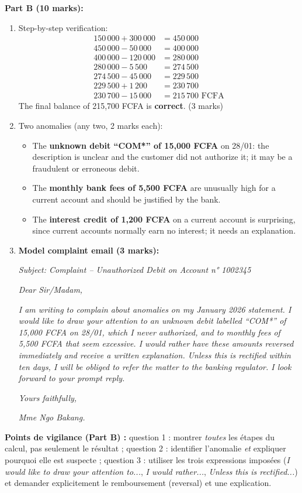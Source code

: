 \documentclass[11pt]{article}
\begin{document}
\begin{corrige}
\textbf{Part B (10 marks):}
\begin{enumerate}
    \item Step-by-step verification:
    \begin{align*}
    150\,000 + 300\,000 &= 450\,000 \\
    450\,000 - 50\,000 &= 400\,000 \\
    400\,000 - 120\,000 &= 280\,000 \\
    280\,000 - 5\,500 &= 274\,500 \\
    274\,500 - 45\,000 &= 229\,500 \\
    229\,500 + 1\,200 &= 230\,700 \\
    230\,700 - 15\,000 &= 215\,700 \text{ FCFA}
    \end{align*}
    The final balance of 215,700 FCFA is \textbf{correct}. (3 marks)
    \item Two anomalies (any two, 2 marks each):
    \begin{itemize}
        \item The \textbf{unknown debit ``COM*'' of 15,000 FCFA} on 28/01: the description is unclear and the customer did not authorize it; it may be a fraudulent or erroneous debit.
        \item The \textbf{monthly bank fees of 5,500 FCFA} are unusually high for a current account and should be justified by the bank.
        \item The \textbf{interest credit of 1,200 FCFA} on a current account is surprising, since current accounts normally earn no interest; it needs an explanation.
    \end{itemize}
    \item \textbf{Model complaint email (3 marks):}

    \emph{Subject: Complaint -- Unauthorized Debit on Account n° 1002345}

    \emph{Dear Sir/Madam,}

    \emph{I am writing to complain about anomalies on my January 2026 statement. I would like to draw your attention to an unknown debit labelled ``COM*'' of 15,000 FCFA on 28/01, which I never authorized, and to monthly fees of 5,500 FCFA that seem excessive. I would rather have these amounts reversed immediately and receive a written explanation. Unless this is rectified within ten days, I will be obliged to refer the matter to the banking regulator. I look forward to your prompt reply.}

    \emph{Yours faithfully,}

    \emph{Mme Ngo Bakang.}
\end{enumerate}
\textbf{Points de vigilance (Part B) :} question 1 : montrer \emph{toutes} les étapes du calcul, pas seulement le résultat ; question 2 : identifier l'anomalie \emph{et} expliquer pourquoi elle est suspecte ; question 3 : utiliser les trois expressions imposées (\emph{I would like to draw your attention to...}, \emph{I would rather...}, \emph{Unless this is rectified...}) et demander explicitement le remboursement (reversal) et une explication.
\end{corrige}
\end{document}
